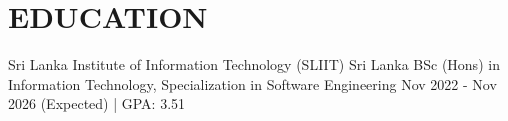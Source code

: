 \section{EDUCATION}

\resumeentry
  {Sri Lanka Institute of Information Technology (SLIIT)}
  {Sri Lanka}
  {BSc (Hons) in Information Technology, Specialization in Software Engineering}
  {Nov 2022 - Nov 2026 (Expected) | GPA: 3.51}
